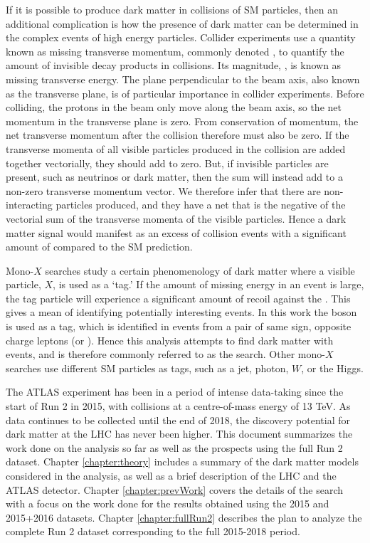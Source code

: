If it is possible to produce dark matter in collisions of SM particles, then an additional complication is how the presence of dark matter can be determined in the complex events of high energy particles. Collider experiments use a quantity known as missing transverse momentum, commonly denoted \etmissvec, to quantify the amount of invisible decay products in collisions. Its magnitude, \etmiss, is known as missing transverse energy. The plane perpendicular to the beam axis, also known as the transverse plane, is of particular importance in collider experiments. Before colliding, the protons in the beam only move along the beam axis, so the net momentum in the transverse plane is zero. From conservation of momentum, the net transverse momentum after the collision therefore must also be zero. If the transverse momenta of all visible particles produced in the collision are added together vectorially, they should add to zero. But, if invisible particles are present, such as neutrinos or dark matter, then the sum will instead add to a non-zero transverse momentum vector. We therefore infer that there are non-interacting particles produced, and they have a net \etmissvec that is the negative of the vectorial sum of the transverse momenta of the visible particles. Hence a dark matter signal would manifest as an excess of collision events with a significant amount of \etmiss compared to the SM prediction.

Mono-$X$ searches study a certain phenomenology of dark matter where a visible particle, $X$, is used as a `tag.' If the amount of missing energy in an event is large, the tag particle will experience a significant amount of recoil against the \etmissvec. This gives a mean of identifying potentially interesting events. In this work the \Z boson is used as a tag, which is identified in events from a pair of same sign, opposite charge leptons (\epem or \mpmm). Hence this analysis attempts to find dark matter with \Zlletmiss events, and is therefore commonly referred to as the \monoZll search. Other mono-$X$ searches use different SM particles as tags, such as a jet, photon, $W$, or the Higgs.

The ATLAS experiment has been in a period of intense data-taking since the start of Run 2 in 2015, with \pp collisions at a centre-of-mass energy of 13 TeV. As data continues to be collected until the end of 2018, the discovery potential for dark matter at the LHC has never been higher. This document summarizes the work done on the \monoZll analysis so far as well as the prospects using the full Run 2 dataset. Chapter \ref{chapter:theory} includes a summary of the dark matter models considered in the analysis, as well as a brief description of the LHC and the ATLAS detector. Chapter \ref{chapter:prevWork} covers the details of the search with a focus on the work done for the results obtained using the 2015 and 2015+2016 datasets. Chapter \ref{chapter:fullRun2} describes the plan to analyze the complete Run 2 dataset corresponding to the full 2015-2018 period.


